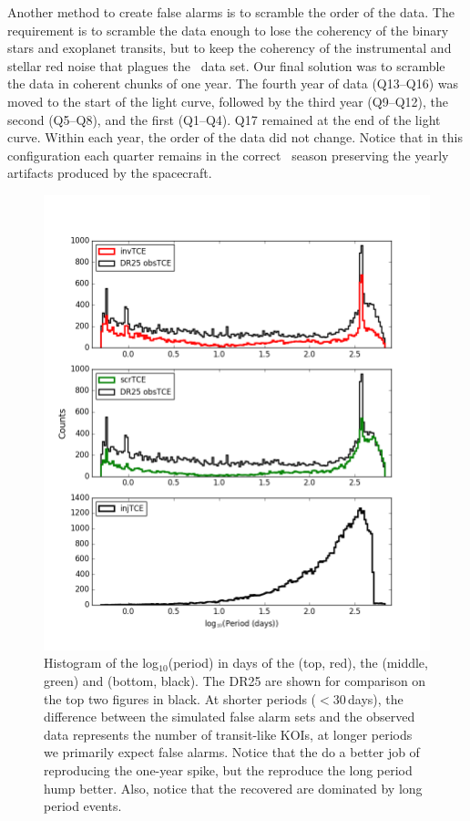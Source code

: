 Another method to create false alarms is to scramble the order of the data. The requirement is to scramble the data enough to lose the coherency of the binary stars and exoplanet transits, but to keep the coherency of the instrumental and stellar red noise that plagues the \Kepler\ data set. Our final solution was to scramble the data in coherent chunks of one year. The fourth year of data (Q13--Q16) was moved to the start of the light curve, followed by the third year (Q9--Q12), the second (Q5--Q8), and the first (Q1--Q4). Q17 remained at the end of the light curve. Within each year, the order of the data did not change. Notice that in this configuration each quarter remains in the correct \Kepler\ season preserving the yearly artifacts produced by the spacecraft.


\begin{figure}[ht]
 \begin{center}
  \includegraphics[width=0.88\linewidth]{fig-simulTcePeriods.png}
  \caption{Histogram of the log$_{10}$(period) in days of the  (top, red), the  (middle, green) and  (bottom, black). The DR25  are shown for comparison on the top two figures in black.  At shorter periods ($< 30$\,days), the difference between the simulated false alarm sets and the observed data represents the number of transit-like KOIs, at longer periods we primarily expect false alarms.  Notice that the  do a better job of reproducing the one-year spike, but the  reproduce the long period hump better. Also, notice that the recovered  are dominated by long period events. }
  \label{f:simtces} 
 \end{center}
 \end{figure}



